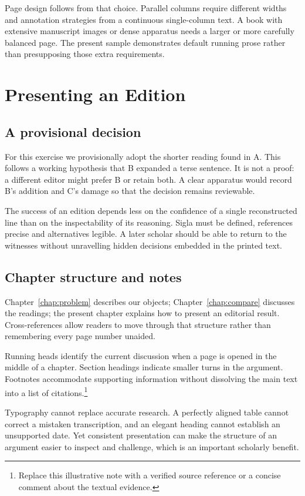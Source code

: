 \documentclass{impebook}
\begin{document}
Page design follows from that choice. Parallel columns
require different widths and annotation strategies
from a continuous single-column text. A book with
extensive manuscript images or dense apparatus
needs a larger or more carefully balanced page.
The present sample demonstrates default running
prose rather than presupposing those extra requirements.

\chapter{Presenting an Edition}\label{chap:edition}
\section{A provisional decision}
For this exercise we provisionally adopt the shorter
reading found in A. This follows a working hypothesis
that B expanded a terse sentence. It is not a proof:
a different editor might prefer B or retain both.
A clear apparatus would record B's addition and
C's damage so that the decision remains reviewable.

The success of an edition depends less on the
confidence of a single reconstructed line than on
the inspectability of its reasoning. Sigla must
be defined, references precise and alternatives
legible. A later scholar should be able to return
to the witnesses without unravelling hidden
decisions embedded in the printed text.

\section{Chapter structure and notes}
Chapter~\ref{chap:problem} describes our objects;
Chapter~\ref{chap:compare} discusses the readings;
the present chapter explains how to present an
editorial result. Cross-references allow readers
to move through that structure rather than
remembering every page number unaided.

Running heads identify the current discussion
when a page is opened in the middle of a chapter.
Section headings indicate smaller turns in the
argument. Footnotes accommodate supporting
information without dissolving the main text
into a list of citations.\footnote{Replace this
illustrative note with a verified source reference
or a concise comment about the textual evidence.}

Typography cannot replace accurate research.
A perfectly aligned table cannot correct a
mistaken transcription, and an elegant heading
cannot establish an unsupported date. Yet
consistent presentation can make the structure
of an argument easier to inspect and challenge,
which is an important scholarly benefit.
\end{document}
